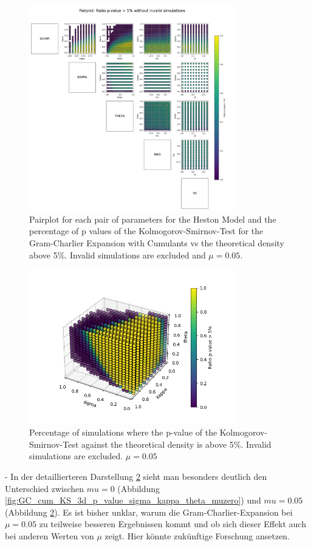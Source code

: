 \begin{figure}
    \centering
    \includegraphics[width=0.8\textwidth]{img/pairplot_GC_cum_KS.png}
    \caption{Pairplot for each pair of parameters for the Heston Model and the percentage of p values of the Kolmogorov-Smirnov-Test for the Gram-Charlier Expansion with Cumulants vs the theoretical density above 5\%. Invalid simulations are excluded and $\mu=0.05$.}
    \label{fig:pairplot_GC_cum_KS_mu005}
\end{figure}

\begin{figure}
    \centering
    \includegraphics[width=0.8\textwidth]{img/GC_cum_KS_3d_p_value_sigma_kappa_theta.png}
    \caption{Percentage of simulations where the p-value of the Kolmogorov-Smirnov-Test against the theoretical density is above 5\%. Invalid simulations are excluded. $\mu=0.05$}
    \label{fig:GC_cum_KS_3d_p_value_sigma_kappa_theta_mu005}
\end{figure}

- In der detaillierteren Darstellung \ref{fig:GC_cum_KS_3d_p_value_sigma_kappa_theta_mu005} sieht man besonders deutlich den Unterschied zwischen $mu=0$ (Abbildung \ref{fig:GC_cum_KS_3d_p_value_sigma_kappa_theta_muzero}) und $mu=0.05$ (Abbildung \ref{fig:GC_cum_KS_3d_p_value_sigma_kappa_theta_mu005}). Es ist bisher unklar, warum die Gram-Charlier-Expansion bei $\mu=0.05$ zu teilweise besseren Ergebnissen kommt und ob sich dieser Effekt auch bei anderen Werten von $\mu$ zeigt. Hier könnte zukünftige Forschung ansetzen.